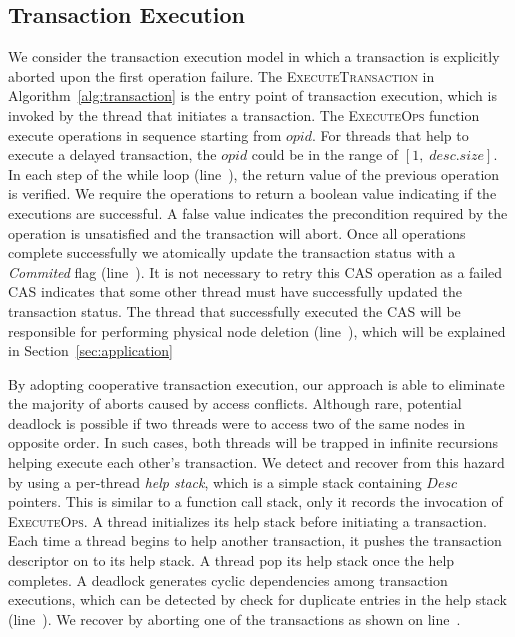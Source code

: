 \documentclass[]{sig-alternate-05-2015}
\begin{document}
\subsection{Transaction Execution}
\label{sec:txnexec}
We consider the transaction execution model in which a transaction is explicitly aborted upon the first operation failure.
The \textsc{ExecuteTransaction} in Algorithm~\ref{alg:transaction} is the entry point of transaction execution, which is invoked by the thread that initiates a transaction.
The \textsc{ExecuteOps} function execute operations in sequence starting from $opid$.
For threads that help to execute a delayed transaction, the $opid$ could be in the range of $[1,\;desc.size]$.
In each step of the while loop (line~), the return value of the previous operation is verified.
We require the operations to return a boolean value indicating if the executions are successful.
A false value indicates the precondition required by the operation is unsatisfied and the transaction will abort. 
Once all operations complete successfully we atomically update the transaction status with a \emph{Commited} flag (line~).
It is not necessary to retry this CAS operation as a failed CAS indicates that some other thread must have successfully updated the transaction status.
The thread that successfully executed the CAS will be responsible for performing physical node deletion (line~), which will be explained in Section~\ref{sec:application}

By adopting cooperative transaction execution, our approach is able to eliminate the majority of aborts caused by access conflicts.
Although rare, potential deadlock is possible if two threads were to access two of the same nodes in opposite order.
In such cases, both threads will be trapped in infinite recursions helping execute each other's transaction.
We detect and recover from this hazard by using a per-thread \emph{help stack}, which is a simple stack containing $Desc$ pointers. 
This is similar to a function call stack, only it records the invocation of \textsc{ExecuteOps}.
A thread initializes its help stack before initiating a transaction.
Each time a thread begins to help another transaction, it pushes the transaction descriptor on to its help stack.
A thread pop its help stack once the help completes.
A deadlock generates cyclic dependencies among transaction executions, which can be detected by check for duplicate entries in the help stack (line~). 
We recover by aborting one of the transactions as shown on line~.
\end{document}
